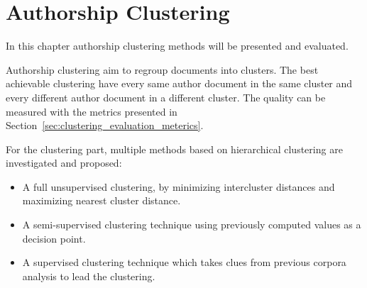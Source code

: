 \section{Authorship Clustering \label{sec:clustering}}

In this chapter authorship clustering methods will be presented and evaluated.

Authorship clustering aim to regroup documents into clusters.
The best achievable clustering have every same author document in the same cluster and every different author document in a different cluster.
The quality can be measured with the metrics presented in Section~\ref{sec:clustering_evaluation_meterics}.

For the clustering part, multiple methods based on hierarchical clustering are investigated and proposed:
\begin{itemize}
  \item
  A full unsupervised clustering, by minimizing intercluster distances and maximizing nearest cluster distance.
  \item
  A semi-supervised clustering technique using previously computed values as a decision point.
  \item
  A supervised clustering technique which takes clues from previous corpora analysis to lead the clustering.
\end{itemize}






